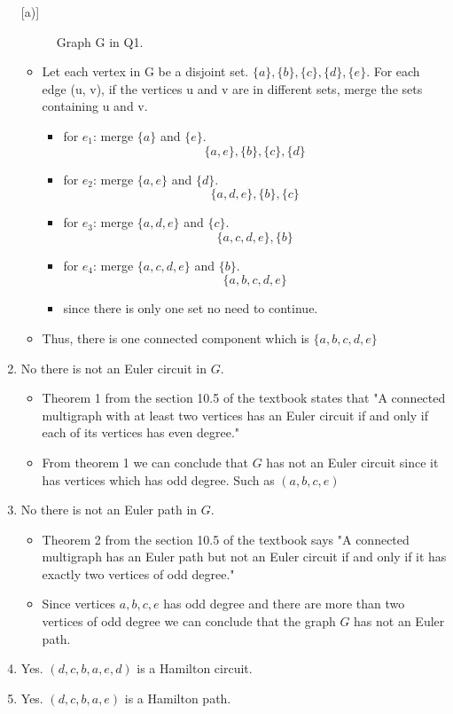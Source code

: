 \documentclass[12pt]{article}
\begin{document}
\begin{enumerate} [a)]
\begin{figure}[H]
\begin{tikzpicture}
    	\end{tikzpicture} 
    	\caption{Graph G in Q1.}	
    	\label{fig:g1}
    \end{figure}
     \begin{itemize}
         \item Let each vertex in G be a disjoint set. $\{ a\},\{ b\},\{ c\},\{ d\},\{ e\}$. For each edge (u, v), if the vertices u and v are in different sets, merge the sets containing u and v.
         \begin{itemize}
             \item for $e_1$: merge $\{ a\}$ and $\{ e\}$. $$\{ a,e\},\{ b\},\{ c\},\{ d\}$$
             \item for $e_2$: merge $\{ a,e\}$ and $\{ d\}$. $$\{ a,d,e\},\{ b\},\{ c\}$$
             \item for $e_3$: merge $\{ a,d,e\}$ and $\{ c\}$. $$\{ a,c,d,e\},\{ b\}$$
             \item for $e_4$: merge $\{ a,c,d,e\}$ and $\{ b\}$. $$\{ a,b,c,d,e\}$$
             \item since there is only one set no need to continue.
         \end{itemize}
         \item Thus, there is one connected component which is $\{ a,b,c,d,e\}$
     \end{itemize}
     \item No there is not an Euler circuit in $G$.
     \begin{itemize}
         \item Theorem 1 from the section 10.5 of the textbook states that "A connected multigraph with at least two vertices has an Euler circuit if and only if each of its vertices has even degree."
         \item From theorem 1 we can conclude that $G$ has not an Euler circuit since it has vertices which has odd degree. Such as $(a,b,c,e)$
     \end{itemize}
     \item No there is not an Euler path in $G$.
     \begin{itemize}
        \item Theorem 2 from the section 10.5 of the textbook says "A connected multigraph has an Euler path but not an Euler circuit if and only if it has exactly
two vertices of odd degree."
        \item Since vertices $a,b,c,e$ has odd degree and there are more than two vertices of odd degree we can conclude that the graph $G$ has not an Euler path.
     \end{itemize}
     \item Yes. $(d,c,b,a,e,d)$ is a Hamilton circuit.
     \item Yes. $(d,c,b,a,e)$ is a Hamilton path.
     
\end{enumerate}
\end{document}
